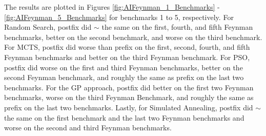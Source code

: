\documentclass[runningheads]{llncs}
\begin{document}
\par The results are plotted in Figures \ref{fig:AIFeynman_1_Benchmarks} - \ref{fig:AIFeynman_5_Benchmarks} for benchmarks 1 to 5, respectively. For Random Search, postfix did $\sim$ the same on the first, fourth, and fifth Feynman benchmarks, better on the second benchmark, and worse on the third benchmark. For MCTS, postfix did worse than prefix on the first, second, fourth, and fifth Feynman benchmarks and better on the third Feynman benchmark. For PSO, postfix did worse on the first and third Feynman benchmarks, better on the second Feynman benchmark, and roughly the same as prefix on the last two benchmarks. For the GP approach, postfix did better on the first two Feynman benchmarks, worse on the third Feynman Benchmark, and roughly the same as prefix on the last two benchmarks. Lastly, for Simulated Annealing, postfix did $\sim$ the same on the first benchmark and the last two Feynman benchmarks and worse on the second and third Feynman benchmarks.
\end{document}
